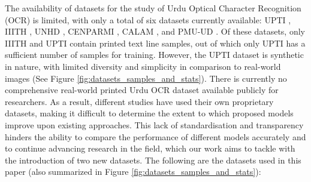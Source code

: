 \documentclass[runningheads]{llncs}
\begin{document}
The availability of datasets for the study of Urdu Optical Character Recognition (OCR) is limited, with only a total of six datasets currently available: UPTI \cite{upti_paper}, IIITH \cite{iiith17urdu}, UNHD \cite{unhd_paper}, CENPARMI \cite{cenparmi_paper}, CALAM \cite{calam_paper}, and PMU-UD \cite{pmu_ud_paper}. Of these datasets, only IIITH and UPTI contain printed text line samples, out of which only UPTI has a sufficient number of samples for training. However, the UPTI dataset is synthetic in nature, with limited diversity and simplicity in comparison to real-world images (See Figure \ref{fig:datasets_samples_and_stats}). There is currently no comprehensive real-world printed Urdu OCR dataset available publicly for researchers. As a result, different studies have used their own proprietary datasets, making it difficult to determine the extent to which proposed models improve upon existing approaches. This lack of standardisation and transparency hinders the ability to compare the performance of different models accurately and to continue advancing research in the field, which our work aims to tackle with the introduction of two new datasets. The following are the datasets used in this paper (also summarized in Figure \ref{fig:datasets_samples_and_stats}):
\end{document}
